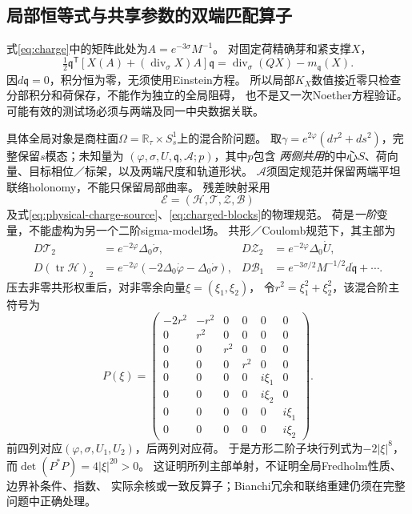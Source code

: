 \documentclass[UTF8,a4paper,11pt,fontset=fandol]{ctexart}
\numberwithin{equation}{section}
\theoremstyle{definition}
\newcommand{\tr}{\operatorname{tr}}
\newcommand{\R}{\mathbb R}
\begin{document}
\subsection{局部恒等式与共享参数的双端匹配算子}
式\eqref{eq:charge}中的矩阵此处为$A=e^{-3\sigma}M^{-1}$。
对固定荷精确芽和紧支撑$X$，
\[
 \tfrac12\mathfrak q^{\mathsf T}
  [X(A)+(\operatorname{div}_\sigma X)A]\mathfrak q
 =\operatorname{div}_\sigma(QX)-m_{\mathfrak q}(X).
\]
因$d\mathfrak q=0$，积分恒为零，无须使用Einstein方程。
所以局部$K_X$数值接近零只检查分部积分和荷保存，不能作为独立的全局阻碍，
也不是又一次Noether方程验证。可能有效的测试场必须与两端及同一中央数据关联。

具体全局对象是商柱面$\Omega=\R_\tau\times S^1_s$上的混合阶问题。
取$\gamma=e^{2\varphi}(d\tau^2+ds^2)$，完整保留$s$模态；未知量为
$(\varphi,\sigma,U,\mathfrak q,\mathcal A;p)$，其中$p$包含
\emph{两侧共用}的中心$S$、荷向量、目标相位／标架，以及两端尺度和轨道形状。
$\mathcal A$须固定规范并保留两端平坦联络holonomy，不能只保留局部曲率。
残差映射采用
\[
 \mathscr E=(\mathscr H,\mathscr T,\mathscr Z,\mathscr B)
\]
及式\eqref{eq:physical-charge-source}、\eqref{eq:charged-blocks}的物理规范。
荷是\emph{一阶}变量，不能虚构为另一个二阶sigma-model场。
共形／Coulomb规范下，其主部为
\begin{align}
 D\mathscr T_2&=e^{-2\varphi}\Delta_0\dot\sigma,&
 D\mathscr Z_2&=e^{-2\varphi}\Delta_0\dot U,\nonumber\\
 D(\tr\mathscr H)_2&=e^{-2\varphi}
       (-2\Delta_0\dot\varphi-\Delta_0\dot\sigma),&
 D\mathscr B_1&=e^{-3\sigma/2}M^{-1/2}d\dot{\mathfrak q}+\cdots.
\end{align}
压去非零共形权重后，对非零余向量$\xi=(\xi_1,\xi_2)$，
令$r^2=\xi_1^2+\xi_2^2$，该混合阶主符号为
\[
 P(\xi)=
 \begin{pmatrix}
 -2r^2&-r^2&0&0&0&0\\
 0&r^2&0&0&0&0\\
 0&0&r^2&0&0&0\\
 0&0&0&r^2&0&0\\
 0&0&0&0&i\xi_1&0\\
 0&0&0&0&i\xi_2&0\\
 0&0&0&0&0&i\xi_1\\
 0&0&0&0&0&i\xi_2
 \end{pmatrix}.
\]
前四列对应$(\varphi,\sigma,U_1,U_2)$，后两列对应荷。
于是方形二阶子块行列式为$-2|\xi|^8$，
而$\det(P^*P)=4|\xi|^{20}>0$。
这证明所列主部单射，不证明全局Fredholm性质、边界补条件、指数、
实际余核或一致反算子；Bianchi冗余和联络重建仍须在完整问题中正确处理。
\end{document}
